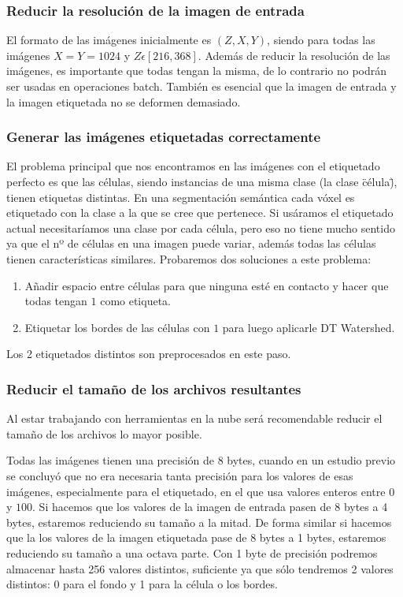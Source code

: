 \subsubsection{Reducir la resolución de la imagen de entrada}

El formato de las imágenes inicialmente es $ (Z,X,Y) $, siendo para todas las imágenes $ X = Y = 1024 $ y $ Z\epsilon[216,368] $. Además de reducir la resolución de las imágenes, es importante que todas tengan la misma, de lo contrario no podrán ser usadas en operaciones batch. También es esencial que la imagen de entrada y la imagen etiquetada no se deformen demasiado.

\subsubsection{Generar las imágenes etiquetadas correctamente}

El problema principal que nos encontramos en las imágenes con el etiquetado perfecto es que las células, siendo instancias de una misma clase (la clase \"célula\"), tienen etiquetas distintas. En una segmentación semántica cada vóxel es etiquetado con la clase a la que se cree que pertenece. Si usáramos el etiquetado actual necesitaríamos una clase por cada célula, pero eso no tiene mucho sentido ya que el nº de células en una imagen puede variar, además todas las células tienen características similares. Probaremos dos soluciones a este problema:

\begin{enumerate}
\item Añadir espacio entre células para que ninguna esté en contacto y hacer que todas tengan $ 1 $ como etiqueta.
\item Etiquetar los bordes de las células con $ 1 $ para luego aplicarle DT Watershed.
\end{enumerate}
Los 2 etiquetados distintos son preprocesados en este paso.

\subsubsection{Reducir el tamaño de los archivos resultantes}

Al estar trabajando con herramientas en la nube será recomendable reducir el tamaño de los archivos lo mayor posible.

Todas las imágenes tienen una precisión de 8 bytes, cuando en un estudio previo se concluyó que no era necesaria tanta precisión para los valores de esas imágenes, especialmente para el etiquetado, en el que usa valores enteros entre $0$ y $100$. Si hacemos que los valores de la imagen de entrada pasen de 8 bytes a 4 bytes, estaremos reduciendo su tamaño a la mitad. De forma similar si hacemos que la los valores de la imagen etiquetada pase de 8 bytes a 1 bytes, estaremos reduciendo su tamaño a una octava parte. Con 1 byte de precisión podremos almacenar hasta 256 valores distintos, suficiente ya que sólo tendremos 2 valores distintos: 0 para el fondo y 1 para la célula o los bordes. 

